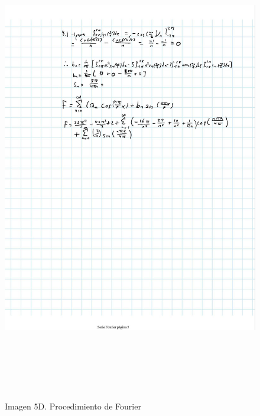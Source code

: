 \begin{figure}[H]
	\centering
	\includegraphics[width=6.26772in,height=8.11111in]{media/image58.jpg}
	\caption{Imagen 5D. Procedimiento de Fourier}
\end{figure}

